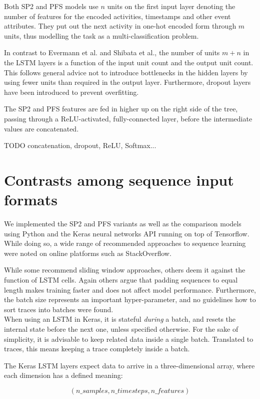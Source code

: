 Both SP2 and PFS models use $n$ units on the first input layer denoting the number of features for the encoded activities, timestamps and other event attributes. They put out the next activity in one-hot encoded form through $m$ units, thus modelling the task as a multi-classification problem.

In contrast to Evermann et al. and Shibata et al., the number of units $m+n$ in the LSTM layers is a function of the input unit count and the output unit count. This follows general advice not to introduce bottlenecks in the hidden layers by using fewer units than required in the output layer. Furthermore, dropout layers have been introduced to prevent overfitting.

The SP2 and PFS features are fed in higher up on the right side of the tree, passing through a ReLU-activated, fully-connected layer, before the intermediate values are concatenated.

TODO concatenation, dropout, ReLU, Softmax...

\section{Contrasts among sequence input formats}
\label{sec:contrib:input-formatting}
We implemented the SP2 and PFS variants as well as the comparison models using Python and the Keras neural networks API running on top of Tensorflow. While doing so, a wide range of recommended approaches to sequence learning were noted on online platforms such as StackOverflow.

While some recommend sliding window approaches, others deem it against the function of LSTM cells. Again others argue that padding sequences to equal length makes training faster and does not affect model performance. Furthermore, the batch size represents an important hyper-parameter, and no guidelines how to sort traces into batches were found.\\

When using an LSTM in Keras, it is stateful \textit{during} a batch, and resets the internal state before the next one, unless specified otherwise. For the sake of simplicity, it is advisable to keep related data inside a single batch. Translated to traces, this means keeping a trace completely inside a batch.

The Keras LSTM layers expect data to arrive in a three-dimensional array, where each dimension has a defined meaning:

$$(n\_samples, n\_timesteps, n\_features)$$

